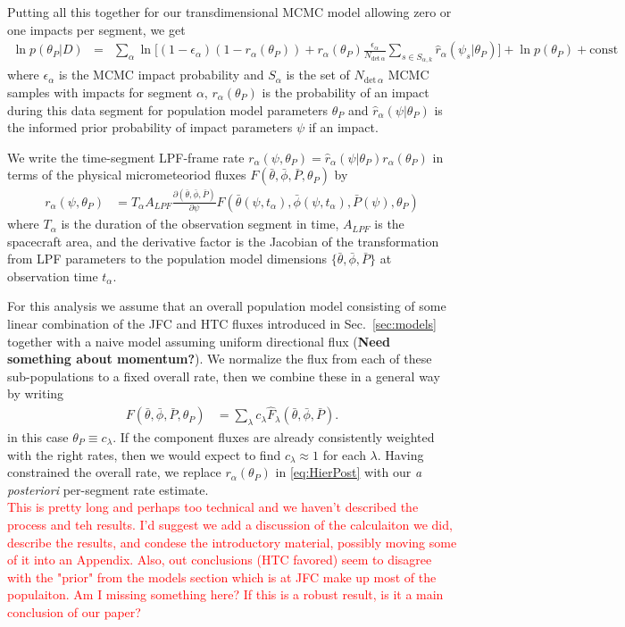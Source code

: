 \documentclass[twocolumn, trackchanges]{aastex61}
\newcommand{\red}[1]{\textcolor{red}{#1}}
\begin{document}
Putting all this together for our transdimensional MCMC model allowing zero or one impacts per segment, we get
\begin{eqnarray}
  \ln p(\theta_P|D)&=& \sum_\alpha\ln\Big[ (1-\epsilon_\alpha)(1-r_\alpha(\theta_P))+r_\alpha(\theta_P)\frac{\epsilon_\alpha}{N_{\mathrm{det}\,\alpha}}\sum_{s\in S_{\alpha,k}}\hat r_\alpha(\psi_s|\theta_P)\Big]+\ln p(\theta_P)+\mathrm{const}\label{eq:HierPost}
\end{eqnarray}
where $\epsilon_\alpha$ is the MCMC impact probability and $S_{\alpha}$ is the set of $N_{\mathrm{det}\,\alpha}$ MCMC samples with impacts for segment $\alpha$, $r_\alpha(\theta_P)$ is the probability of an impact during this data segment for population model parameters $\theta_P$ and $\hat r_\alpha(\psi|\theta_P)$ is the informed prior probability of impact parameters $\psi$ if an impact.

 We write the time-segment LPF-frame rate $r_\alpha(\psi,\theta_P)=\hat r_\alpha(\psi|\theta_P)r_\alpha(\theta_P)$ in terms of the physical micrometeoriod fluxes $F(\bar\theta,\bar\phi,\bar P,\theta_P)$ by
\begin{align}
  r_\alpha(\psi,\theta_P)&=T_\alpha A_{LPF}\frac{\partial(\bar\theta,\bar\phi,\bar P)}{\partial\psi}F(\bar\theta(\psi,t_\alpha),\bar\phi(\psi,t_\alpha),\bar P(\psi),\theta_P)
\end{align}
where $T_\alpha$ is the duration of the observation segment in time, $A_{LPF}$ is the spacecraft area, and the derivative factor is the Jacobian of the transformation from LPF parameters to the population model dimensions $\{\bar\theta,\bar\phi,\bar P\}$ at observation time $t_\alpha$.

For this analysis we assume that an overall population model consisting of some linear combination of the JFC and HTC fluxes introduced in Sec.~\ref{sec:models} together with a naive model assuming uniform directional flux (\textbf{Need something about momentum?}). We normalize the flux from each of these sub-populations to a fixed overall rate, then we combine these in a general way by writing
\begin{align}
  F(\bar\theta,\bar\phi,\bar P,\theta_P)&=\sum_{\lambda} c_\lambda \hat F_\lambda(\bar\theta,\bar\phi,\bar P).\nonumber
\end{align}
in this case $\theta_P\equiv{c_\lambda}$.  If the component fluxes are already consistently weighted with the right rates, then we would expect to find $c_\lambda\approx1$ for each $\lambda$. Having constrained the overall rate, we replace $r_\alpha(\theta_P)$ in \eqref{eq:HierPost} with our \emph{a posteriori} per-segment rate estimate.
\\
\red{This is pretty long and perhaps too technical and we haven't described the process and teh results. I'd suggest we add a discussion of the calculaiton we did, describe the results, and condese the introductory material, possibly moving some of it into an Appendix.  Also, out conclusions (HTC favored) seem to disagree with the "prior" from the models section which is at JFC make up most of the populaiton. Am I missing something here? If this is a robust result, is it a main conclusion of our paper?}
\end{document}
